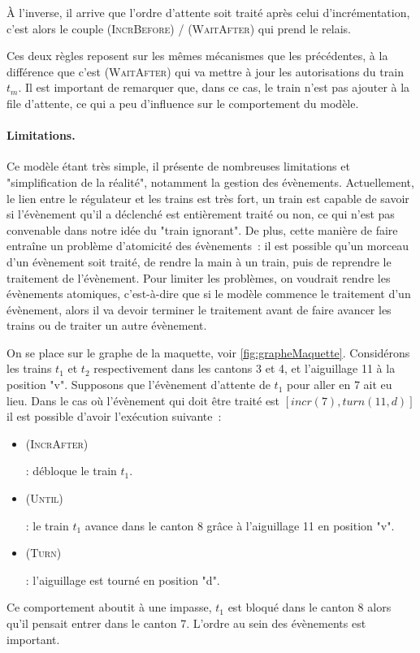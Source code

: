 \documentclass[oneside, a4paper, 11pt]{book}
\newcommand{\ruleFmt}[1]{\textsc{(#1)}}
\newcommand{\ruleDef}[1]{\hypertarget{#1}{\ruleFmt{#1}}}
\newcommand{\trainFmt}[1]{{\color{traincolor} #1}}
\begin{document}
\noindent
À l'inverse, il arrive que l'ordre d'attente soit traité après celui d'incrémentation, c'est alors le couple \ruleDef{IncrBefore} / \ruleDef{WaitAfter} qui prend le relais.

Ces deux règles reposent sur les mêmes mécanismes que les précédentes, à la différence que c'est \ruleDef{WaitAfter} qui va mettre à jour les autorisations du train \trainFmt{$t_m$}.
Il est important de remarquer que, dans ce cas, le train n'est pas ajouter à la file d'attente, ce qui a peu d'influence sur le comportement du modèle.


\paragraph{Limitations.}
Ce modèle étant très simple, il présente de nombreuses limitations et "simplification de la réalité", notamment la gestion des évènements. 
Actuellement, le lien entre le régulateur et les trains est très fort, un train est capable de savoir si l'évènement qu'il a déclenché est entièrement traité ou non, ce qui n'est pas convenable dans notre idée du "train ignorant".
De plus, cette manière de faire entraîne un problème d'atomicité des évènements~: il est possible qu'un morceau d'un évènement soit traité, de rendre la main à un train, puis de reprendre le traitement de l'évènement.
Pour limiter les problèmes, on voudrait rendre les évènements atomiques, c'est-à-dire que si le modèle commence le traitement d'un évènement, alors il va devoir terminer le traitement avant de faire avancer les trains ou de traiter un autre évènement.


\begin{example}[Atomicité]
	On se place sur le graphe de la maquette, voir \ref{fig:grapheMaquette}. Considérons les trains $t_1$ et $t_2$ respectivement dans les cantons 3 et 4, et l'aiguillage 11 à la position "v". Supposons que l'évènement d'attente de $t_1$ pour aller en 7 ait eu lieu.
	Dans le cas où l'évènement qui doit être traité est $[incr(7),turn(11,d)]$ il est possible d'avoir l'exécution suivante~:
	\begin{itemize}
		\item \ruleDef{IncrAfter} : débloque le train $t_1$.
		\item \ruleDef{Until} : le train $t_1$ avance dans le canton 8 grâce à l'aiguillage 11 en position "v".
		\item \ruleDef{Turn} : l'aiguillage est tourné en position "d".
	\end{itemize}
	Ce comportement aboutit à une impasse, $t_1$ est bloqué dans le canton 8 alors qu'il pensait entrer dans le canton 7. L'ordre au sein des évènements est important.
\end{example}
\end{document}
